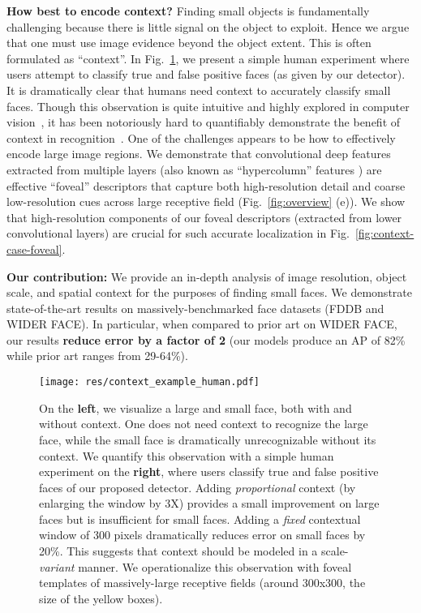 \documentclass[10pt,twocolumn,letterpaper]{article}
\begin{document}
{\bf How best to encode context?} Finding small objects is fundamentally challenging because there is little signal on the object to exploit. Hence we argue that one must use image evidence beyond the object extent. This is often formulated as ``context''.   In Fig.~\ref{fig:context-example}, we present a simple human experiment where users attempt to classify true and false positive faces (as given by our detector). It is dramatically clear that humans need context to accurately classify small faces. Though this observation is quite intuitive and highly explored in computer vision~\cite{oliva2007role,torralba2003context}, it has been notoriously hard to quantifiably demonstrate the benefit of context in recognition~\cite{divvala2009empirical,galleguillos2010context,wolf2006critical}. One of the challenges appears to be how to effectively encode large image regions. We demonstrate that convolutional deep features extracted from multiple layers (also known as ``hypercolumn'' features \cite{hariharan2015hypercolumns,long2015fully}) are effective ``foveal'' descriptors that capture both high-resolution detail and coarse low-resolution cues across large receptive field (Fig.~\ref{fig:overview} (e)). We show that high-resolution components of our foveal descriptors (extracted from lower convolutional layers) are crucial for such accurate localization in Fig.~\ref{fig:context-case-foveal}. 





{\bf Our contribution:} We provide an in-depth analysis of image resolution, object scale, and spatial context for the purposes of finding small faces. We demonstrate state-of-the-art results on massively-benchmarked face datasets (FDDB and WIDER FACE). In particular, when compared to prior art on WIDER FACE, our results {\bf reduce error by a factor of 2} (our models produce an AP of 82\% while prior art ranges from 29-64\%).




\begin{figure}[t]
  \centering
\texttt{[image: res/context\_example\_human.pdf]}
\caption{On the {\bf left}, we visualize a large and small face, both with and without context. One does not need context to recognize the large face, while the small face is dramatically unrecognizable without its context. We quantify this observation with a simple human experiment on the {\bf right}, where users classify true and false positive faces of our proposed detector.  Adding {\em proportional} context (by enlarging the window by 3X) provides a small improvement on large faces but is insufficient for small faces.  Adding a {\em fixed} contextual window of 300 pixels dramatically reduces error on small faces by 20\%.  This suggests that context should be modeled in a scale-{\em variant} manner. We operationalize this observation with foveal templates of massively-large receptive fields (around 300x300, the size of the yellow boxes).}
\label{fig:context-example}  
\end{figure}
\end{document}
